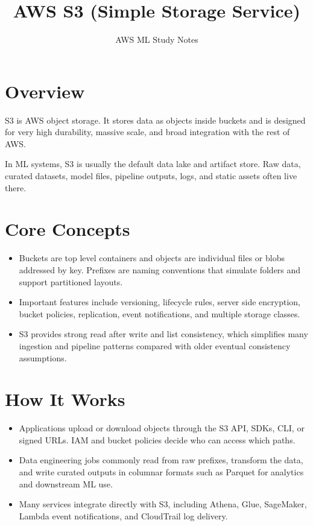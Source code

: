 \documentclass[10pt,twocolumn]{article}
\begin{document}
\title{\vspace{-1.6cm}AWS S3 (Simple Storage Service)}
\author{AWS ML Study Notes}
\date{}
\maketitle
\small

\section*{Overview}
S3 is AWS object storage. It stores data as objects inside buckets and is designed for very high durability, massive scale, and broad integration with the rest of AWS.

In ML systems, S3 is usually the default data lake and artifact store. Raw data, curated datasets, model files, pipeline outputs, logs, and static assets often live there.

\section*{Core Concepts}
\begin{itemize}
\item Buckets are top level containers and objects are individual files or blobs addressed by key. Prefixes are naming conventions that simulate folders and support partitioned layouts.
\item Important features include versioning, lifecycle rules, server side encryption, bucket policies, replication, event notifications, and multiple storage classes.
\item S3 provides strong read after write and list consistency, which simplifies many ingestion and pipeline patterns compared with older eventual consistency assumptions.
\end{itemize}

\section*{How It Works}
\begin{itemize}
\item Applications upload or download objects through the S3 API, SDKs, CLI, or signed URLs. IAM and bucket policies decide who can access which paths.
\item Data engineering jobs commonly read from raw prefixes, transform the data, and write curated outputs in columnar formats such as Parquet for analytics and downstream ML use.
\item Many services integrate directly with S3, including Athena, Glue, SageMaker, Lambda event notifications, and CloudTrail log delivery.
\end{itemize}
\end{document}
